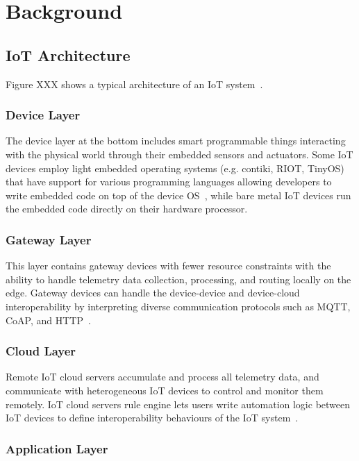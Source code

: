 
\chapter{Background}
\label{ch:background}

\section{IoT Architecture}
Figure XXX%
 shows a typical architecture of an IoT system~\citep{towardsIoTDefinition,stojkoska2017review,vcolakovic2018IoT,eclipse2016three}. 

\subsection{Device Layer}
The device layer at the bottom includes smart programmable things interacting with the physical world through their embedded sensors and actuators. Some IoT devices employ light embedded operating systems (e.g. contiki, RIOT, TinyOS) that have support for various programming languages allowing developers to write embedded code on top of the device OS~\cite{javed2018OS}, while bare metal IoT devices run the embedded code directly on their hardware processor.

\subsection{Gateway Layer}
This layer contains gateway devices with fewer resource constraints with the ability to handle telemetry data collection, processing, and routing locally on the edge. Gateway devices can handle the device-device and device-cloud interoperability by interpreting diverse communication protocols such as MQTT, CoAP, and HTTP~\cite{tschofenig2014architectural}. 

\subsection{Cloud Layer}
Remote IoT cloud servers accumulate and process all telemetry data, and communicate with heterogeneous IoT devices to control and monitor them remotely. IoT cloud servers rule engine lets users write automation logic between IoT devices to define interoperability behaviours of the IoT system~\cite{securityUsenix2019}. 

\subsection{Application Layer}





\endinput

